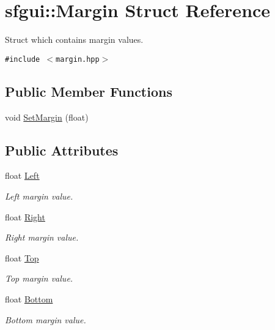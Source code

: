 \hypertarget{structsfgui_1_1Margin}{
\section{sfgui::Margin Struct Reference}
\label{structsfgui_1_1Margin}
}
Struct which contains margin values.  


{\tt \#include $<$margin.hpp$>$}

\subsection*{Public Member Functions}
\begin{CompactItemize}
\item 
void \hyperlink{structsfgui_1_1Margin_6a505d8275fe7965b863d437dd54b195}{SetMargin} (float)
\end{CompactItemize}
\subsection*{Public Attributes}
\begin{CompactItemize}
\item 
float \hyperlink{structsfgui_1_1Margin_fb75f9e4550f4eb5d26c6af936f7e098}{Left}
\begin{CompactList}\small\item\em Left margin value. \item\end{CompactList}\item 
float \hyperlink{structsfgui_1_1Margin_fef8bae507f9cc00a42f442256062b66}{Right}
\begin{CompactList}\small\item\em Right margin value. \item\end{CompactList}\item 
float \hyperlink{structsfgui_1_1Margin_1ab360b58e3be2e8385f8e4225508ea4}{Top}
\begin{CompactList}\small\item\em Top margin value. \item\end{CompactList}\item 
float \hyperlink{structsfgui_1_1Margin_f9b744e36bb7d913b20959f7c9516fa6}{Bottom}
\begin{CompactList}\small\item\em Bottom margin value. \item\end{CompactList}\end{CompactItemize}


